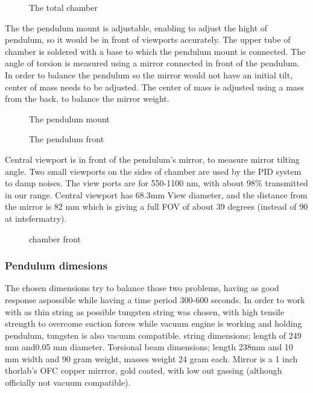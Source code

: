 \documentclass[\main/master.tex]{subfiles}
\begin{document}
\begin{figure}[htbp]
	\centering
	\caption[total chamber]{The total chamber}
	\label{fig:total}
\end{figure}

\noindent
The the pendulum mount is adjustable, enabling to adjust the hight of pendulum, so it would be in front of viewports accurately. The upper tube of chamber is soldered with a base to which the pendulum mount is connected. The angle of torsion is measured using a mirror connected in front of the pendulum. In order to balance the pendulum so the mirror would not have an initial tilt, center of mass needs to be adjusted. The center of mass is adjusted using a mass from the back, to balance the mirror weight.

\begin{figure}[htbp]
	\centering
	\caption[Pendulum mount]{The pendulum mount}
	\label{fig:mount}
\end{figure}



\begin{figure}[htbp]
	\centering
	\caption[Pendulum front]{The pendulum front}
	\label{fig:pendulum front}
\end{figure}

\noindent
Central viewport is in front of the pendulum's mirror, to measure mirror tilting angle. Two small viewports on the sides of chamber are used by the PID system to damp noises. The view ports are for 550-1100 nm, with about 98$\%$ transmitted in our range. Central viewport has 68.3mm View diameter, and the distance from the mirror is 82 mm which is giving a full FOV of about 39 degrees (instead of 90 at intefermatry).

\begin{figure}[htbp]
	\centering
	\caption[chamber front]{chamber front}
	\label{fig:chamber front}
\end{figure}

\subsubsection{Pendulum dimesions}
The chosen dimensions try to balance those two problems, having as good response aspossible while having a time period 300-600 seconds. In order to work with as thin string as possible tungsten string was chosen, with high tensile strength to overcome suction forces while vacuum engine is working and holding pendulum, tungsten is also vacuum compatible. string dimensions; length of 249 mm and0.05 mm diameter. Torsional beam dimensions; length 238mm and 10 mm width and 90 gram weight, masses weight 24 gram each. Mirror is a 1 inch thorlab’s OFC copper mirrror, gold coated, with low out gassing (although officially not vacuum compatible).
\end{document}
